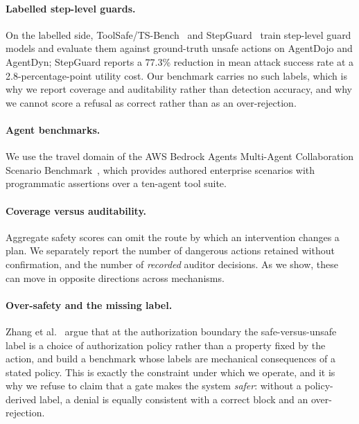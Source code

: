 \documentclass[11pt]{article}
\begin{document}
\paragraph{Labelled step-level guards.}
On the labelled side, ToolSafe/TS-Bench~\cite{mou2026toolsafe} and
StepGuard~\cite{zheng2026stepguard} train step-level guard models and evaluate
them against ground-truth unsafe actions on AgentDojo and AgentDyn; StepGuard
reports a 77.3\% reduction in mean attack success rate at a 2.8-percentage-point
utility cost. Our benchmark carries no such labels, which is why we report
coverage and auditability rather than detection accuracy, and why we cannot score
a refusal as correct rather than as an over-rejection.

\paragraph{Agent benchmarks.}
We use the travel domain of the AWS Bedrock Agents Multi-Agent Collaboration
Scenario Benchmark~\cite{awsbench2024,shu2024effective}, which provides
authored enterprise scenarios with programmatic assertions over a ten-agent
tool suite.

\paragraph{Coverage versus auditability.}
Aggregate safety scores can omit the route by which an intervention changes a plan. We separately report the number of
dangerous actions retained without confirmation, and the number of
\emph{recorded} auditor decisions. As we show, these can move in opposite
directions across mechanisms.

\paragraph{Over-safety and the missing label.}
Zhang et al.~\cite{zhang2026guard} argue that at the authorization boundary the
safe-versus-unsafe label is a choice of authorization policy rather than a
property fixed by the action, and build a benchmark whose labels are mechanical
consequences of a stated policy. This is exactly the constraint under which we
operate, and it is why we refuse to claim that a gate makes the system
\emph{safer}: without a policy-derived label, a denial is equally consistent
with a correct block and an over-rejection.
\end{document}
